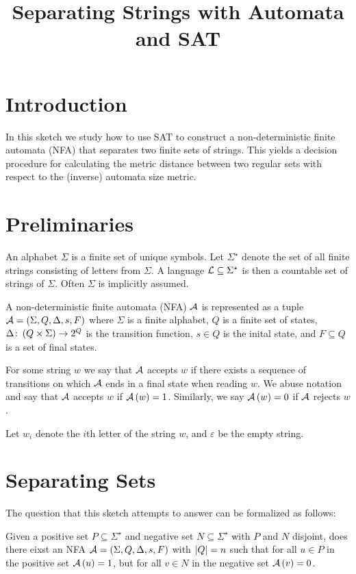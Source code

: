 \documentclass[12pt]{article}
\title{Separating Strings with Automata and SAT}
\date{}
\begin{document}
\maketitle

\section{Introduction}
In this sketch we study
how to use SAT to construct a non-deterministic finite automata (NFA)
that separates two finite sets of strings.
This yields a decision procedure for calculating
the metric distance between two regular sets with respect to the
(inverse) automata size metric.


\section{Preliminaries}
An alphabet \(\Sigma\) is a finite set of unique symbols.
Let \(\Sigma^\star\) denote the set of all finite strings consisting of
letters from \(\Sigma\).
A language \(\mathcal{L} \subseteq \Sigma^\star\) is then
a countable set of strings of \(\Sigma\).
Often \(\Sigma\) is implicitly assumed.

A non-deterministic finite automata (NFA) \(\mathcal{A}\) is represented
as a tuple
\(\mathcal{A} = \left(\Sigma, Q, \Delta, s, F\right)\)
where \(\Sigma\) is a finite alphabet,
\(Q\) is a finite set of states,
\(\Delta \colon \left(Q \times \Sigma\right) \to 2^{Q}\)
is the transition function,
\(s \in Q\) is the inital state,
and \(F \subseteq Q\) is a set of final states.

For some string \(w\) we say that \(\mathcal{A}\) accepts \(w\)
if there exists a sequence of transitions on which \(\mathcal{A}\) ends
in a final state when reading \(w\).
We abuse notation and say
that \(\mathcal{A}\) accepts \(w\) if \(\mathcal{A}\left(w\right) = 1\).
Similarly, we say \(\mathcal{A}\left(w\right) = 0\) if \(\mathcal{A}\) rejects \(w\).

Let \(w_i\) denote the \(i\)th letter of the string \(w\),
and \(\varepsilon\) be the empty string.



\section{Separating Sets}

The question that this sketch attempts to answer can be formalized as follows:

\begin{question}
Given a positive set \(P \subseteq \Sigma^\star\)
and negative set \(N \subseteq \Sigma^\star\)
with \(P\) and \(N\) disjoint,
does there eixst an NFA
\(\mathcal{A} = \left(\Sigma, Q, \Delta, s, F\right)\)
with \(\left\lvert Q\right\rvert = n\)
such that for all \(u \in P\) in the positive set \(\mathcal{A}\left(u\right) = 1\),
but for all \(v \in N\) in the negative set \(\mathcal{A}\left(v\right) = 0\).
\end{question}
\end{document}
